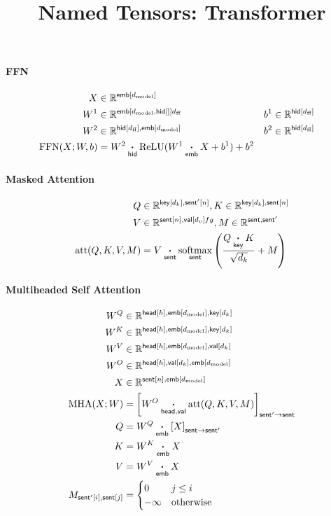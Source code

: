 \documentclass{article}
\title{Named Tensors: Transformer}
\date{}
\newcommand{\reals}[0]{\mathbb{R}}
\newcommand{\dmodel}{d_{\text{model}}}
\newcommand{\dff}{d_{\text{ff}}}
\begin{document}
\maketitle


\paragraph{FFN}
\begin{align*}
X &\in \reals^{\nset{emb}{\dmodel}} \\
W^1 &\in \reals^{\nset{emb}{\dmodel, \nset{hid}}{\dff}} & 
b^1 &\in \reals^{\nset{hid}{\dff}} \\
W^2 & \in \reals^{\nset{hid}{\dff}, \nset{emb}{\dmodel}} & b^2 &\in \reals^{\nset{hid}{\dff}} \\
\text{FFN}(X; W, b) &=  W^2 \ndot{hid} \text{ReLU}(W^1 \ndot{emb} X + b^1) + b^2
\end{align*}

\paragraph{Masked Attention}
\begin{align*} 
Q &\in \reals^{\nset{key}{d_k}, \nset{sent'}{n}}, K \in \reals^{\nset{key}{d_k}, \nset{sent}{n}}\\
V &\in \reals^{\nset{sent}{n}, \nset{val}{d_v}fg
},
M \in \reals^{\name{sent}, \name{sent'}}\\
\text{att}(Q, K, V, M) &=  V \ndot{sent} \nfun{sent}{softmax} \left( \frac{\displaystyle Q \ndot{key} K }{\sqrt{d_k}} + M \right) 
\end{align*}

\paragraph{Multiheaded Self Attention}
\begin{align*}
  W^Q &\in \mathbb{R}^{\nset{head}{h}, \nset{emb}{\dmodel}, \nset{key}{d_k}} \\
  W^K &\in \mathbb{R}^{\nset{head}{h}, \nset{emb}{\dmodel}, \nset{key}{d_k}} \\
  W^V &\in \mathbb{R}^{\nset{head}{h}, \nset{emb}{\dmodel}, \nset{val}{d_k}} \\
  W^O &\in \mathbb{R}^{\nset{head}{h}, \nset{val}{d_k}, \nset{emb}{\dmodel}} \\
  X &\in \mathbb{R}^{\nset{sent}{n}, \nset{emb}{\dmodel}} \\
  \text{MHA}(X; W) &= \nmov{sent'}{sent}{W^O \ndot{head,val} \text{att}(Q, K, V, M)} \\
  Q &= W^Q \ndot{emb} \nmov{sent}{sent'}{X} \\
  K &= W^K \ndot{emb} X \\
  V &= W^V \ndot{emb} X \\
  M_{\nidx{sent'}{i}, \nset{sent}{j}} &= \begin{cases} 0 & j\leq i \\ -\infty & \text{otherwise} \end{cases}   
\end{align*}
\end{document}
